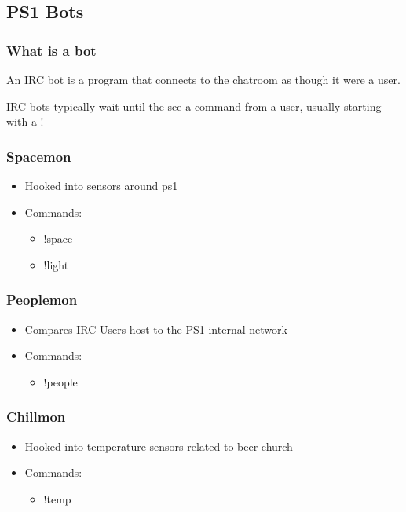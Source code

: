 \documentclass[hyperref={pdfpagelabels=false}]{beamer}
\begin{document}
	\subsection{PS1 Bots}
		\frame
		{
			\frametitle{What is a bot}
			An IRC bot is a program that connects to the
			chatroom as though it were a user.

			IRC bots typically wait until the see a command
			from a user, usually starting with a !
		}
		\frame
		{
			\frametitle{Spacemon}
			\begin{itemize}
				\item{Hooked into sensors around ps1}
				\item{Commands:}
				\begin{itemize}
					\item{!space}
					\item{!light}
				\end{itemize}
			\end{itemize}
		}
		\frame
		{
			\frametitle{Peoplemon}
			\begin{itemize}
				\item{Compares IRC Users host to the PS1
					internal network}
				\item{Commands:}
				\begin{itemize}
					\item{!people}
				\end{itemize}
			\end{itemize}
		}
		\frame
		{
			\frametitle{Chillmon}
			\begin{itemize}
				\item{Hooked into temperature sensors related
					to beer church}
				\item{Commands:}
				\begin{itemize}
					\item{!temp}
				\end{itemize}
			\end{itemize}
		}
\end{document}
